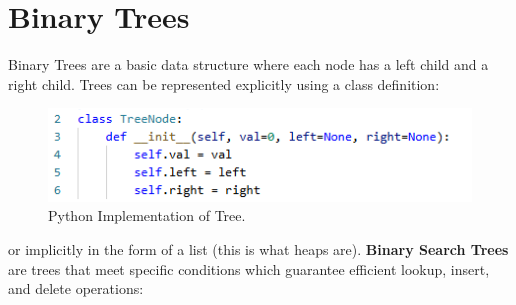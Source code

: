 \documentclass[12pt]{article}
\begin{document}
\section{Binary Trees}
Binary Trees are a basic data structure where each node has a left child and a right child. Trees can be represented explicitly using a class definition:
\begin{figure}[H]
    \centering
    \includegraphics[width=1.0\textwidth]{./treedef.png} %
	\caption{Python Implementation of Tree.}
\end{figure}
or implicitly in the form of a list (this is what heaps are). \textbf{Binary Search Trees} are trees that meet specific conditions which guarantee efficient lookup, insert, and delete operations: 
\begin{table}[H]
\centering
{}
\caption{Binary Tree vs. BST}
\end{table}
\end{document}
